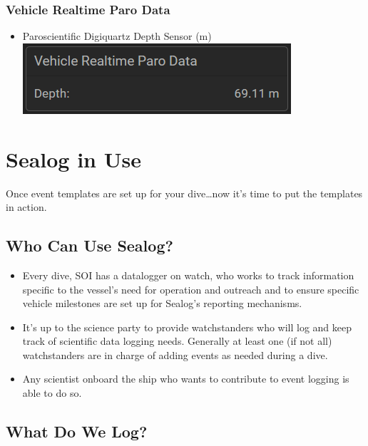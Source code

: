 \documentclass[
  letterpaper,
  DIV=11,
  numbers=noendperiod]{scrreprt}
\providecommand{\tightlist}{%
  \setlength{\itemsep}{0pt}\setlength{\parskip}{0pt}}\usepackage{longtable,booktabs,array}
\begin{document}
\hypertarget{vehicle-realtime-paro-data}{%
\subsubsection{Vehicle Realtime Paro
Data}\label{vehicle-realtime-paro-data}}

\begin{itemize}
\tightlist
\item
  Paroscientific Digiquartz Depth Sensor (m)
  \includegraphics{images/image32.png}
\end{itemize}

\hypertarget{sealog-in-use}{%
\section{Sealog in Use}\label{sealog-in-use}}

Once event templates are set up for your dive\ldots now it's time to put
the templates in action.

\hypertarget{who-can-use-sealog}{%
\subsection{Who Can Use Sealog?}\label{who-can-use-sealog}}

\begin{itemize}
\tightlist
\item
  Every dive, SOI has a datalogger on watch, who works to track
  information specific to the vessel's need for operation and outreach
  and to ensure specific vehicle milestones are set up for Sealog's
  reporting mechanisms.
\item
  It's up to the science party to provide watchstanders who will log and
  keep track of scientific data logging needs. Generally at least one
  (if not all) watchstanders are in charge of adding events as needed
  during a dive.
\item
  Any scientist onboard the ship who wants to contribute to event
  logging is able to do so.
\end{itemize}

\hypertarget{what-do-we-log}{%
\subsection{What Do We Log?}\label{what-do-we-log}}
\end{document}
